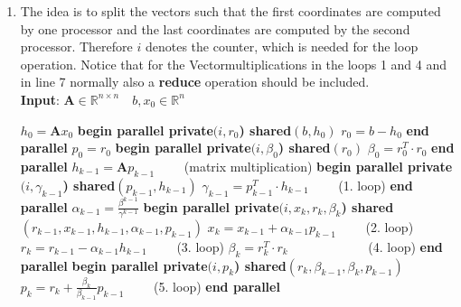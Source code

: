 \documentclass{article}
\begin{document}
\begin{enumerate}[label=(\alph*)]
\item
  The idea is to split the vectors such that the first coordinates are computed by one processor and the last coordinates are computed by the second processor. Therefore $i$ denotes the counter, which is needed for the loop operation. Notice that for the Vectormultiplications in the loops 1 and 4 and in line 7 normally also a \textbf{reduce} operation should be included.
  \\
   \textbf{Input}: $ \textbf{A} \in \mathbb{R}^{n\times n} \quad b, x_0\in \mathbb{R}^n$
    \begin{algorithmic}[1]
	\State $h_{0} = \textbf{A}x_{0}$ 
	\State \textbf{begin parallel private$(i, r_{0}$) shared$(b, h_{0})$}
	\State $r_0 = b - h_0$
	\State \textbf{end parallel}
	\State $p_0 = r_0$
	\State \textbf{begin parallel private$(i, \beta_{0}$) shared$(r_0)$}
	\State $\beta_0 = r_0^T\cdot r_0$
	\State \textbf{end parallel}
	\State $h_{k-1} = \textbf{A}p_{k-1}\qquad$ (matrix multiplication)
	\State \textbf{begin parallel private$(i, \gamma_{k-1}$) shared$(p_{k-1}, h_{k-1})$}
	\State $\gamma_{k-1} = p^{T}_{k-1}\cdot h_{k-1}\qquad$ (1. loop)
	\State \textbf{end parallel}
	\State $\alpha_{k-1} = \frac{\beta^{k-1}}{\gamma^{k-1}}$
	\State \textbf{begin parallel private$(i,x_k, r_k, \beta_k$) shared$(r_{k-1},x_{k-1}, h_{k-1},\alpha_{k-1}, p_{k-1})$}
	\State $x_k = x_{k-1} + \alpha_{k-1}p_{k-1}\qquad$ (2. loop)
	\State $r_k = r_{k-1} - \alpha_{k-1}h_{k-1}\qquad$ (3. loop)
	\State $\beta_k = r_k^T\cdot r_k\qquad \qquad \qquad$ (4. loop)
	\State \textbf{end parallel}
	\State \textbf{begin parallel private$(i, p_k$) shared$(r_{k}, \beta_{k-1}, \beta_{k}, p_{k-1})$}
	\State $p_k = r_{k} + \frac{\beta_k}{\beta_{k-1}}p_{k-1}\qquad$ (5. loop)
	\State \textbf{end parallel}
	\EndFor
    \end{algorithmic}



\end{enumerate}
\end{document}
